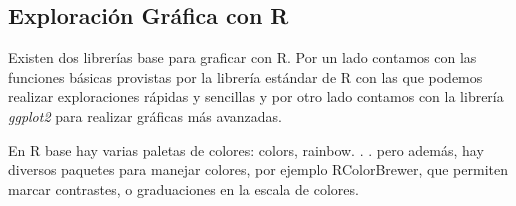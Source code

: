 




\subsection{Exploración Gráfica con R}
Existen dos librerías base para graficar con R. Por un lado contamos con las funciones básicas provistas por la librería estándar de R con las que podemos realizar exploraciones rápidas y sencillas y por otro lado contamos con la librería \textit{ggplot2} para realizar gráficas más avanzadas.

En R base hay varias paletas de colores: colors, rainbow. . . pero además, hay diversos paquetes para manejar colores, por ejemplo RColorBrewer, que permiten marcar contrastes, o graduaciones en la escala de colores.


